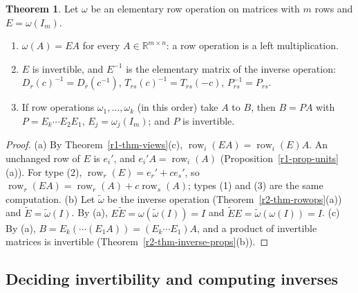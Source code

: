 \documentclass[12pt]{article}
\newcommand{\R}{\mathbb R}
\DeclareMathOperator{\row}{row}
\theoremstyle{definition}
\newtheorem{theorem}{Theorem}
\begin{document}
\begin{theorem}\label{r2-thm-elementary}
Let \(\omega\) be an elementary row operation on matrices with \(m\) rows and \(E=\omega(I_m)\).
\begin{enumerate}
\item \(\omega(A)=EA\) for every \(A\in\R^{m\times n}\): a row operation is a left
multiplication.
\item \(E\) is invertible, and \(E^{-1}\) is the elementary matrix of the inverse operation:
\(D_r(c)^{-1}=D_r(c^{-1})\), \(T_{rs}(c)^{-1}=T_{rs}(-c)\), \(P_{rs}^{-1}=P_{rs}\).
\item If row operations \(\omega_1,\dots,\omega_k\) (in this order) take \(A\) to \(B\), then
\(B=PA\) with \(P=E_k\cdots E_2E_1\), \(E_j=\omega_j(I_m)\); and \(P\) is invertible.
\end{enumerate}
\end{theorem}
\begin{proof}
(a) By Theorem~\ref{r1-thm-views}(c), \(\row_i(EA)=\row_i(E)A\). An unchanged row of \(E\) is
\(e_i'\), and \(e_i'A=\row_i(A)\) (Proposition~\ref{r1-prop-units}(a)). For type (2), \(\row_r(E)=e_r'+ce_s'\),
so \(\row_r(EA)=\row_r(A)+c\row_s(A)\); types (1) and (3) are the same computation. (b) Let
\(\tilde\omega\) be the inverse operation (Theorem~\ref{r2-thm-rowops}(a)) and \(\tilde E=\tilde\omega(I)\). By (a),
\(E\tilde E=\omega(\tilde\omega(I))=I\) and \(\tilde EE=\tilde\omega(\omega(I))=I\). (c) By (a), \(B=E_k(\cdots(E_1A))=(E_k\cdots E_1)A\),
and a product of invertible matrices is invertible (Theorem~\ref{r2-thm-inverse-props}(b)).
\end{proof}

\subsection*{Deciding invertibility and computing inverses}
\end{document}
